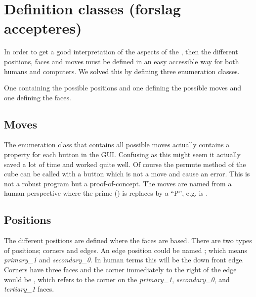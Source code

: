 \section{Definition classes (forslag accepteres)}
In order to get a good interpretation of the aspects of the \cube{}, then the different positions, faces and moves must be defined in an easy accessible way for both humans and computers. We solved this by defining three enumeration classes. 

One containing the possible positions and one defining the possible moves and one defining the faces.

\subsection{Moves}
\label{sub:moves}
The enumeration class that contains all possible moves actually contains a property for each button in the GUI. Confusing as this might seem it actually saved a lot of time and worked quite well. Of course the permute method of the cube can be called with a button which is not a move and cause an error. This is not a robust program but a proof-of-concept. 
The moves are named from a human perspective where the prime () is replaces by a ``P'', e.g.  is .

\subsection{Positions}
The different positions are defined where the faces are based. There are two types of positions; corners and edges.
An edge position could be named ; which means \textit{primary\_1} and \textit{secondary\_0}.
In human terms this will be the down front edge.
Corners have three faces and the corner immediately to the right of the edge would be , which refers to the corner on the \textit{primary\_1}, \textit{secondary\_0}, and \textit{tertiary\_1} faces.

